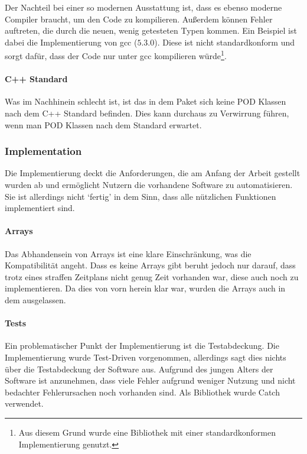       Der Nachteil bei einer so modernen Ausstattung ist, dass es ebenso moderne Compiler braucht, um den Code zu kompilieren. Außerdem können Fehler auftreten, die durch die neuen, wenig getesteten Typen kommen. Ein Beispiel ist dabei die  Implementierung von gcc ($5.3.0$). Diese ist nicht standardkonform und sorgt dafür, dass der Code nur unter gcc kompilieren würde\footnote{
        Aus diesem Grund wurde eine Bibliothek mit einer standardkonformen Implementierung genutzt.
      }.

    \paragraph{C++ Standard}
      Was im Nachhinein schlecht ist, ist das in dem  Paket sich keine POD Klassen nach dem C++ Standard befinden. Dies kann durchaus zu Verwirrung führen, wenn man POD Klassen nach dem Standard erwartet.

  \subsubsection{Implementation}
  \label{sssec:Implementation}
    Die Implementierung deckt die Anforderungen, die am Anfang der Arbeit gestellt wurden ab und ermöglicht Nutzern die vorhandene Software zu automatisieren. Sie ist allerdings nicht `fertig' in dem Sinn, dass alle nützlichen Funktionen implementiert sind.

    \paragraph{Arrays}
    Das Abhandensein von Arrays ist eine klare Einschränkung, was die Kompatibilität angeht. Dass es keine Arrays gibt beruht jedoch nur darauf, dass trotz eines straffen Zeitplans nicht genug Zeit vorhanden war, diese auch noch zu implementieren. Da dies von vorn herein klar war, wurden die Arrays auch in dem  ausgelassen.

    \paragraph{Tests}
    Ein problematischer Punkt der Implementierung ist die Testabdeckung. Die Implementierung wurde Test-Driven vorgenommen, allerdings sagt dies nichts über die Testabdeckung der Software aus. Aufgrund des jungen Alters der Software ist anzunehmen, dass viele Fehler aufgrund weniger Nutzung und nicht bedachter Fehlerursachen noch vorhanden sind. Als Bibliothek wurde Catch \autocite{catch-lib} verwendet.

